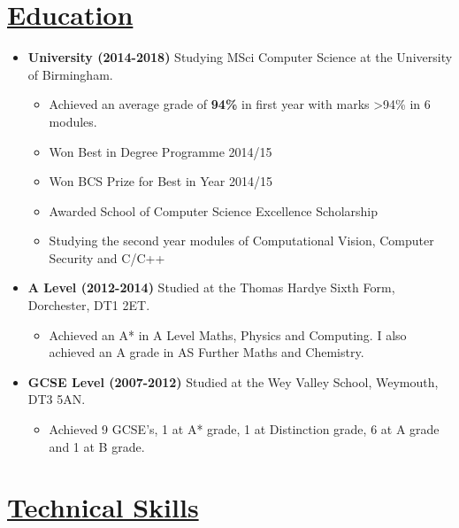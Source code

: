 \documentclass[11pt]{article}
\begin{document}
	\vspace{-30pt}
	\hspace{-100pt}\section*{\underline{Education}}
		\begin {itemize}
			\item \textbf{University (2014-2018)} Studying MSci Computer Science at the University of Birmingham.
				\begin{itemize}
					\item Achieved an average grade of\textbf{ 94\%} in first year with marks \textgreater 94\% in 6 modules.
					\item Won Best in Degree Programme 2014/15
					\item Won BCS Prize for Best in Year 2014/15
					\item Awarded School of Computer Science Excellence Scholarship
					\item Studying the second year modules of Computational Vision, Computer Security and C/C++
				\end{itemize}
			\item \textbf{A Level (2012-2014)} Studied at the Thomas Hardye Sixth Form, Dorchester, DT1 2ET.
				\begin{itemize}
					\item Achieved an A* in A Level Maths, Physics and Computing. I also achieved an A grade in AS Further Maths and Chemistry.
				\end{itemize}
			
			\item \textbf{GCSE Level (2007-2012)}  Studied at the Wey Valley School, Weymouth, DT3 5AN. 
				\begin{itemize}
					\item Achieved 9 GCSE's, 1 at A* grade, 1 at Distinction grade, 6 at A grade and 1 at B grade.
				\end{itemize} 
		\end{itemize}
	\vspace{-20pt}
	\hspace{-100pt}\section*{\underline{Technical Skills}}
\end{document}
